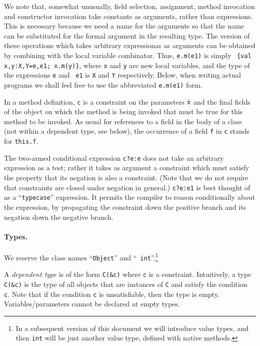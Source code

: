 \documentclass{article}
\begin{document}
We note that, somewhat unusually, field selection, assignment, method
invocation and constructor invocation take constants as arguments,
rather than expressions. This is necessary because we need a name for
the arguments so that the name can be substituted for the formal
argument in the resulting type. The version of these operations which
takes arbitrary expressionas as arguments can be obtained by combining
with the local variable combinator. Thus, {\tt e.m(e1)} is simply {\tt
\{val x,y:X,Y=e,e1; x.m(y)\}}, where {\tt x} and {\tt y} are
new local variables, and the type of the expressions {\tt e} and {\tt
e1} is {\tt X} and {\tt Y} respectively. Below, when writing actual
programs we shall feel free to use the abbreviated {\tt e.m(e1)} form.

In a method definition, {\tt c} is a constraint on the parameters
$\bar{\tt x}$ and the final fields of the object on which the method
is being invoked that must be true for this method to be invoked. As usual
for references to a field in the body of a class (not within 
a dependent type, see below), the occurrence of a field {\tt f} in {\tt c} stands for
{\tt this.f}.

The two-armed conditional expression {\tt c?e:e} does not take an
arbitrary expression as a test; rather it takes as argument a
constraint which must satisfy the property that its negation is also a
constraint. (Note that we do not require that constraints are closed
under negation in general.) {\tt c?e:e1} is best thought of as a
``{\tt typecase}'' expression. It permits the compiler to reason
conditionally about the expression, by propagating the
constraint down the positive branch and its negation down the negative
branch.

\paragraph{Types.}
We reserve the class names ``{\tt Object}'' and ``{\tt
int}''.\footnote{In a subsequent version of this document we will
introduce value types, and then {\tt int} will be just another value
type, defined with native methods.}

A {\em dependent type} is of the form {\tt C(\&c)} where {\tt c} is a
constraint.  Intuitively, a type {\tt C(\&c)} is the type of all
objects that are instances of {\tt C} and satisfy the condition {\tt
c}. Note that if the condition {\tt c} is unsatisfiable, then the type
is empty. Variables/parameters cannot be declared at empty types.  
\end{document}
